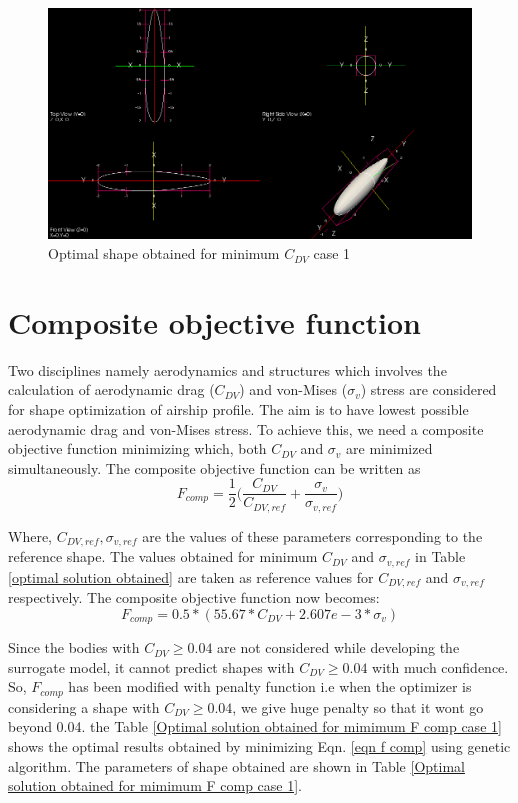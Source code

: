 \begin{figure}[H]
	\centering
	\includegraphics[width=450 pt]{rnd/min_cdv_case1.png}
	\caption{Optimal shape obtained for minimum $ C_{DV} $ case 1}
	\label{Optimal min cdv case 1} %
\end{figure}

\section{Composite objective function}
Two disciplines namely aerodynamics and structures which involves the calculation of aerodynamic drag ($ C_{DV} $) and von-Mises ($ \sigma _{v} $) stress are considered for shape optimization of airship profile. The aim is to have lowest possible aerodynamic drag and von-Mises stress. To achieve this, we need a composite objective function minimizing which, both $ C_{DV} $ and $ \sigma _{v} $ are minimized simultaneously. The composite objective function can be written as
\begin{equation}
F_{comp} = \frac{1}{2}\bigg( \frac{C_{DV}}{C_{DV,ref}} + \dfrac{\sigma _{v}}{\sigma _{v,ref}} \bigg)
\end{equation}

Where, $C_{DV,ref} , \sigma _{v,ref}  $ are the values of these parameters corresponding to the reference shape.  The values obtained for minimum $ C_{DV} $ and ${\sigma _{v,ref}} $ in Table \ref{optimal solution obtained} are taken as reference values for $C_{DV,ref}$ and $ {\sigma _{v,ref}} $ respectively. The composite objective function now becomes:
\begin{equation}
\label{eqn f comp}
F_{comp} = 0.5*(55.67* C_{DV} + 2.607e-3 * \sigma _{v})
\end{equation}

Since the bodies with $C_{DV} \ge 0.04 $ are not considered while developing the surrogate model, it cannot predict shapes with $C_{DV} \ge 0.04 $ with much confidence. So, $ F_{comp} $ has been modified with penalty function i.e when the optimizer is considering a shape with $C_{DV} \ge 0.04 $, we give huge penalty so that it wont go beyond 0.04. the Table \ref{Optimal solution obtained for mimimum F comp case 1} shows the optimal results obtained by minimizing Eqn. \ref{eqn f comp} using genetic algorithm. The parameters of shape obtained are shown in Table \ref{Optimal solution obtained for mimimum F comp case 1}.

